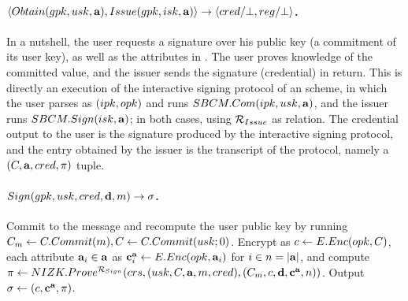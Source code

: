 \paragraph{$\langle Obtain(gpk,usk,\mathbf{a}),Issue(gpk,isk,\mathbf{a}) \rangle
  \rightarrow \langle cred/\bot,reg/\bot \rangle$.} %
In a nutshell, the user requests a signature over his public key (a commitment
of its user key), as well as the attributes in \attrs. The user proves knowledge
of the committed value, and the issuer sends the signature (credential) in return.
This is directly an execution of the interactive signing protocol of an \SBCM
scheme, in which the user parses \gpk as $(ipk,opk)$ and runs $SBCM.Com(ipk,
usk,\mathbf{a})$, and the issuer runs $SBCM.Sign(isk,\mathbf{a})$; in both cases,
using $\mathcal{R}_{Issue}$ as \NIZK relation. The credential \cred output to the
user is the signature produced by the interactive signing protocol, and the
\utrans entry obtained by the issuer is the transcript of the protocol, namely
a $(C,\mathbf{a},cred,\pi)$ tuple.

\iffalse

\todo{This is not consistent with the $\langle \SBCMCom,\SBCMSign \rangle$
  definition...}
  
\begin{itemize}
\item \underline{User}: Commit to the user secret key by running $\Ccom \gets
  \CCommit(\usk)$. Generate proof $\NIZKproof \gets
  \NIZKProve^{\NIZKRel_{\Issue}}(\NIZKcrs,\usk,\Ccom)$. Send $(\Ccom,
  \NIZKproof)$ to the issuer.
\item \underline{Issuer}: Run $\NIZKVerify^{\NIZKRel_{\Issue}}(\NIZKcrs,
  \C,\NIZKproof)$, and return $\bot$ if it fails. Else, create the credential
  by computing $\SBCMsig \gets \SBCMSign(\isk,\C,\attrs)$. Send \SBCMsig to the
  user, and output $\utrans \gets (\C,\SBCMsig,\attrs,\NIZKproof)$.
\item \underline{User}: Check the signature by running $\SBCMVerify(\ipk,
  \SBCMsig,\attrs \cup \lbrace \usk \rbrace)$, and return $\bot$ if
  verification fails. Otherwise, return $\cred \gets \SBCMsig$.
\end{itemize}
\fi

\paragraph{$Sign(gpk,usk,cred,\mathbf{d},m) \rightarrow \sigma$.} %
Commit to the message and recompute the user public key by running
$C_{m} \gets C.Commit(m), C \gets C.Commit(usk; 0)$.
Encrypt \Ccom as $c \gets E.Enc(opk,C)$, each attribute $\mathbf{a}_i \in
\mathbf{a}$ as $\mathbf{c}^{\mathbf{a}}_i \gets E.Enc(opk,\mathbf{a}_i)$ for $i \in n =
|\mathbf{a}|$, and compute  $\pi \gets
NIZK.Prove^{\mathcal{R}_{Sign}}(crs,(usk,C,\mathbf{a},m,cred),(C_{m},
c,\mathbf{d},\mathbf{c}^{\mathbf{a}},n))$. Output $\sigma \gets (c,\mathbf{c}^{\mathbf{a}},
\pi)$.

